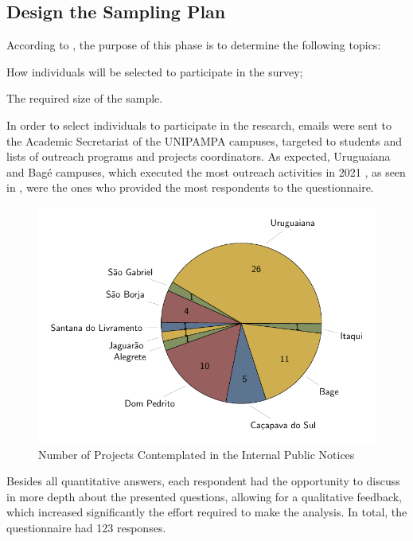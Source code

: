 \subsection{Design the Sampling Plan}\label{sec:survey-sampling}

According to , the purpose of this phase is to determine the following topics:
\begin{inparaenum}[(i)]
  \item How individuals will be selected to participate in the survey;
  \item The required size of the sample.
\end{inparaenum}

In order to select individuals to participate in the research, emails were sent to the Academic Secretariat of the \ac{UNIPAMPA} campuses, targeted to students and lists of outreach programs and projects coordinators. As expected, Uruguaiana and Bagé campuses, which executed the most outreach activities in 2021 \cite{relatorio-2017}, as seen in , were the ones who provided the most respondents to the questionnaire.

\begin{figure}[!htb]
  \caption{Number of Projects Contemplated in the Internal Public Notices}\label{fig:number-of-projects}
  \begin{center}
    \includegraphics[width=16cm]{img/5-number-of-projects.pdf}
  \end{center}
\end{figure}

Besides all quantitative answers, each respondent had the opportunity to discuss in more depth about the presented questions, allowing for a qualitative feedback, which increased significantly the effort required to make the analysis. In total, the questionnaire had 123 responses.

